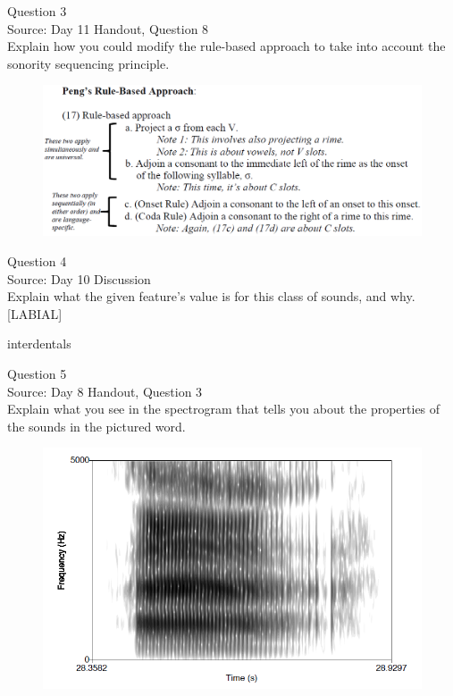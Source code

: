 \documentclass[12pt]{article}
\begin{document}
\newpage

{\large Question 3}\\

Source: Day 11 Handout, Question 8\\

Explain how you could modify the rule-based approach to take into account the sonority sequencing principle.\\

\begin{figure}[H]
\includegraphics{../images/peng_rules.png}
\end{figure}

\newpage

{\large Question 4}\\

Source: Day 10 Discussion\\

Explain what the given feature’s value is for this class of sounds, and why.\\

{[LABIAL]}

interdentals


\newpage

{\large Question 5}\\

Source: Day 8 Handout, Question 3\\

Explain what you see in the spectrogram that tells you about the properties of the sounds in the pictured word.\\

\begin{figure}[H]
\includegraphics{../images/spectrogram_aaah.png}
\end{figure}
\end{document}
